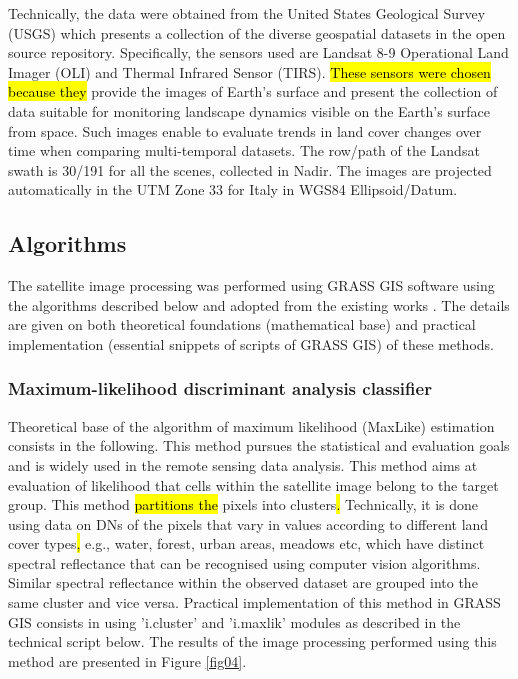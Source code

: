 \documentclass[eprint,
approc,		%
]{actapoly}
\begin{document}
Technically, the data were obtained from the United States Geological Survey (USGS) which presents a collection of the diverse geospatial datasets in the open source repository. Specifically, the sensors used are Landsat 8-9 Operational Land Imager (OLI) and Thermal Infrared Sensor (TIRS). \hl{These sensors were chosen because they }provide the images of Earth's surface and present the collection of data suitable for monitoring landscape dynamics visible on the Earth's surface from space. Such images enable to evaluate trends in land cover changes over time when comparing multi-temporal datasets. The row/path of the Landsat swath is 30/191 for all the scenes, collected in Nadir. The images are projected automatically in the UTM Zone 33 for Italy in WGS84 Ellipsoid/Datum. 

\subsection{Algorithms}

The satellite image processing was performed using GRASS GIS software using the algorithms described below and adopted from the existing works \citep{Lemenkova202217,Lemenkova202313}. The details are given on both theoretical foundations (mathematical base) and practical implementation (essential snippets of scripts of GRASS GIS) of these methods. 

\subsubsection{Maximum-likelihood discriminant analysis classifier}

Theoretical base of the algorithm of maximum likelihood (MaxLike) estimation consists in the following. This method pursues the statistical and evaluation goals and is widely used in the remote sensing data analysis. This method aims at evaluation of likelihood that cells within the satellite image belong to the target group. This method\hl{ partitions the} pixels into\hl{ }clusters\hl{. }Technically, it is done using data on DNs of the pixels that vary in values according to different land cover types\hl{, }e.g., water, forest, urban areas, meadows etc, which have distinct spectral reflectance that can be recognised using computer vision algorithms. Similar spectral reflectance within the observed dataset are grouped into the same cluster and vice versa.\hl{ }Practical implementation of this method in GRASS GIS consists in using 'i.cluster' and 'i.maxlik' modules as described in the technical script below. The results of the image processing performed using this method are presented in Figure \ref{fig04}. 
\end{document}
